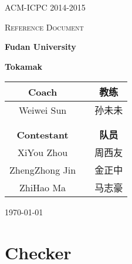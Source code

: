 \documentclass[10pt, a4paper]{article}
\begin{document}
\begin{titlepage}
\begin{center}

\vspace*{4cm}

{\LARGE ACM-ICPC 2014-2015}

\vspace*{1cm}

\textsc{\Huge Reference Document}

\vspace*{3cm}

\textbf{\Huge Fudan University}

\vspace*{1cm}

\textbf{\huge Tokamak}

\vspace*{2cm}

{\Large
\begin{tabular}{cp{1in}c}
\rule{0pt}{16pt} \textbf{Coach} & & \textbf{教练} \\
\midrule
\rule{0pt}{16pt} Weiwei Sun & & 孙未未 \\
\\
\\
\rule{0pt}{16pt} \textbf{Contestant} & & \textbf{队员} \\
\midrule
\rule{0pt}{16pt} XiYou Zhou & & 周西友 \\
\rule{0pt}{16pt} ZhengZhong Jin & & 金正中 \\
\rule{0pt}{16pt} ZhiHao Ma & & 马志豪 \\
\end{tabular}
}

\vspace*{4cm}

{\large\today}

\end{center}
\end{titlepage}

\pagestyle{empty}


\newpage

\begin{multicols}{2}
\small
\tableofcontents
\normalsize
\end{multicols}
\newpage

\pagestyle{fancy}
\setcounter{page}{1}

	\section{Checker}
	
\end{document}
